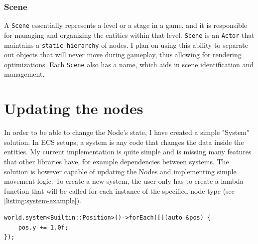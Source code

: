 \subsubsection{Scene}

A \verb|Scene| essentially represents a level or a stage in a game, and it is responsible for managing and organizing the entities within that level.
\verb|Scene| is an \verb|Actor| that maintains a \verb|static_hierarchy| of nodes. I plan on using this ability to separate out objects that will never move during gameplay, thus allowing for rendering optimizations.
Each \verb|Scene| also has a name, which aids in scene identification and management.


\section{Updating the nodes}

In order to be able to change the Node's state, I have created a simple "System" solution. In ECS setups, a system is any code that changes the data inside the entities. My current implementation is quite simple and is missing many features that other libraries have, for example dependencies between systems. The solution is however capable of updating the Nodes and implementing simple movement logic. To create a new system, the user only has to create a lambda function that will be called for each instance of the specified node type (see \autoref{listing:system-example}).

\begin{listing}[h]
    \begin{verbatim}
world.system<Builtin::Position>()->forEach([](auto &pos) {
    pos.y += 1.0f;
});
    \end{verbatim}
    \caption{Example of a simple system that moves all entities with a Position component up by 1 unit.}
    \label{listing:system-example}
\end{listing}

